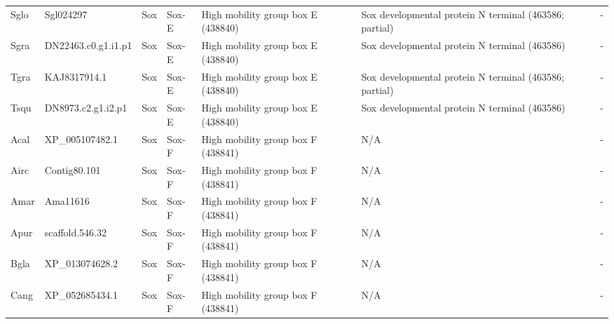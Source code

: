 \documentclass[../main.tex]{subfiles}
\begin{document}
\begin{landscape}
\begin{longtable}{lllllll}
		Sglo           & Sgl024297             & Sox            & Sox-E               & High mobility group box E (438840)          & Sox developmental protein N terminal (463586; partial)                 & -                    \\
		Sgra           & DN22463.c0.g1.i1.p1   & Sox            & Sox-E               & High mobility group box E (438840)          & Sox developmental protein N terminal (463586)                          & -                    \\
		Tgra           & KAJ8317914.1          & Sox            & Sox-E               & High mobility group box E (438840)          & Sox developmental protein N terminal (463586; partial)                 & -                    \\
		Tsqu           & DN8973.c2.g1.i2.p1    & Sox            & Sox-E               & High mobility group box E (438840)          & Sox developmental protein N terminal (463586)                          & -                    \\
		Acal           & XP\_005107482.1       & Sox            & Sox-F               & High mobility group box F (438841)          & N/A                                                                    & -                    \\
		Airc           & Contig80.101          & Sox            & Sox-F               & High mobility group box F (438841)          & N/A                                                                    & -                    \\
		Amar           & Ama11616              & Sox            & Sox-F               & High mobility group box F (438841)          & N/A                                                                    & -                    \\
		Apur           & scaffold.546.32       & Sox            & Sox-F               & High mobility group box F (438841)          & N/A                                                                    & -                    \\
		Bgla           & XP\_013074628.2       & Sox            & Sox-F               & High mobility group box F (438841)          & N/A                                                                    & -                    \\
		Cang           & XP\_052685434.1       & Sox            & Sox-F               & High mobility group box F (438841)          & N/A                                                                    & -                    \\

\end{longtable}
\end{landscape}
\end{document}
